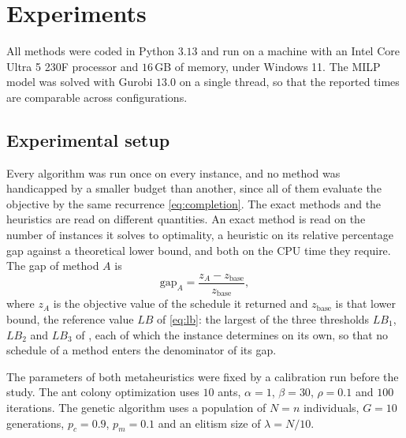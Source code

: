 \documentclass[12pt]{article}
\let\origsubsection\subsection
\renewcommand{\subsection}{\FloatBarrier\origsubsection}
\let\origsection\section
\renewcommand{\section}{\FloatBarrier\origsection}
\begin{document}
\begin{sloppypar}
\section{Experiments}
\label{sec:experiments}

\newcommand{\TBD}{\textcolor{red}{\textbf{[TBD]}}}

All methods were coded in Python $3.13$ and run on a machine with an Intel Core Ultra 5 230F
processor and $16$\,GB of memory, under Windows 11. The MILP model was solved with Gurobi
$13.0$ on a single thread, so that the reported times are comparable across configurations.




\subsection{Experimental setup}

Every algorithm was run once on every instance, and no method was handicapped by a smaller
budget than another, since all of them evaluate the objective by the same recurrence
\cref{eq:completion}. The exact methods and the heuristics are read on different quantities.
An exact method is read on the number of instances it solves to optimality, a heuristic on
its relative percentage gap against a theoretical lower bound, and both on the CPU time they
require. The gap of method $A$ is
\begin{equation}\label{eq:gap}
\text{gap}_A = \frac{z_A-z_{\text{base}}}{z_{\text{base}}},
\end{equation}
where $z_A$ is the objective value of the schedule it returned and $z_{\text{base}}$ is that
lower bound, the reference value $LB$ of \cref{eq:lb}: the largest of the three thresholds
$LB_1$, $LB_2$ and $LB_3$ of , each of which the instance determines on its
own, so that no schedule of a method enters the denominator of its gap.

The parameters of both metaheuristics were fixed by a calibration run before the study.
The ant colony optimization uses $10$ ants, $\alpha=1$, $\beta=30$, $\rho=0.1$
and $100$ iterations. The genetic algorithm uses a population of $N=n$ individuals, $G=10$
generations, $p_c=0.9$, $p_m=0.1$ and an elitism size of $\lambda=N/10$.


\end{sloppypar}
\end{document}
